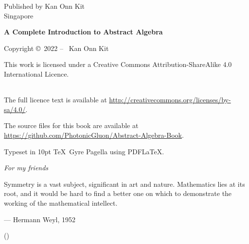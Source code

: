 \newpage{}

\clearpage\null\vfill
\thispagestyle{empty}
\begin{minipage}[b]{0.9\textwidth}
    \footnotesize\raggedright
    \setlength{\parskip}{0.5\baselineskip}

    Published by Kan Onn Kit\\
    Singapore
    \vspace{5cm}

    \textbf{A Complete Introduction to Abstract Algebra}\par
    \editiontext
    \vspace{0.3cm}

    Copyright \copyright \ 2022 -- \the\year\ Kan Onn Kit\par
    This work is licensed under a Creative Commons Attribution-ShareAlike 4.0 International Licence.\par
    \\
    The full licence text is available at \url{http://creativecommons.org/licenses/by-sa/4.0/}.\par
    The source files for this book are available at \url{https://github.com/PhotonicGluon/Abstract-Algebra-Book}.
    \vspace{0.3cm}

    Typeset in 10pt \TeX~Gyre Pagella using PDF\LaTeX.
\end{minipage}

\vspace*{2\baselineskip}
\cleardoublepage

\thispagestyle{empty}
\vspace*{1cm}

\begin{center}
    {\fontsize{18pt}{0}\selectfont \textit{For my friends}}\\
\end{center}

\vspace*{1.5cm}

\begin{center}
    \parbox{10cm}{
        \Large
        Symmetry is a vast subject, significant in art and nature. Mathematics lies at its root, and it would be hard to find a better one on which to demonstrate the working of the mathematical intellect.
        \vspace{0.3cm}

        \hfill
        --- Hermann Weyl, 1952\\
        \vspace{-0.7cm}

        \hfill
        \normalsize
        ({\cite[p.~145]{weyl_1952}})
    }
\end{center}

